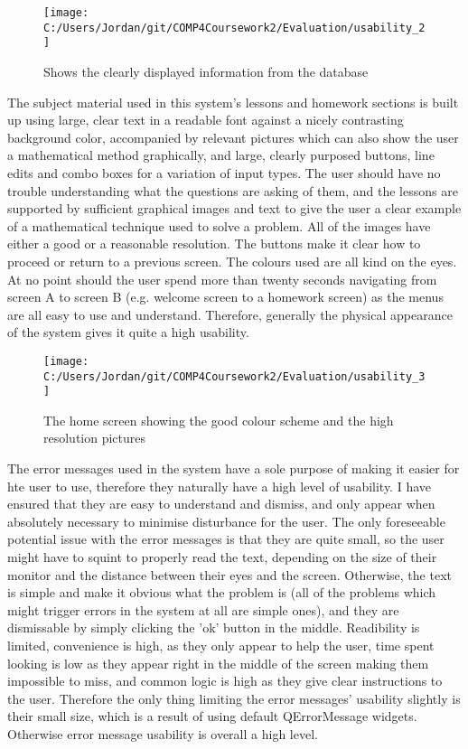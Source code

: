 \begin{figure}[H]
	\texttt{[image: C:/Users/Jordan/git/COMP4Coursework2/Evaluation/usability\_2]}
	\caption{Shows the clearly displayed information from the database}
\end{figure}

The subject material used in this system's lessons and homework sections is built up using large, clear text in a readable font against a nicely contrasting background color, accompanied by relevant pictures which can also show the user a mathematical method graphically, and large, clearly purposed buttons, line edits and combo boxes for a variation of input types. The user should have no trouble understanding what the questions are asking of them, and the lessons are supported by sufficient graphical images and text to give the user a clear example of a mathematical technique used to solve a problem. All of the images have either a good or a reasonable resolution. The buttons make it clear how to proceed or return to a previous screen. The colours used are all kind on the eyes. At no point should the user spend more than twenty seconds navigating from screen A to screen B (e.g. welcome screen to a homework screen) as the menus are all easy to use and understand. Therefore, generally the physical appearance of the system gives it quite a high usability.

\begin{figure}[H]
	\texttt{[image: C:/Users/Jordan/git/COMP4Coursework2/Evaluation/usability\_3]}
	\caption{The home screen showing the good colour scheme and the high resolution pictures}
\end{figure}

The error messages used in the system have a sole purpose of making it easier for hte user to use, therefore they naturally have a high level of usability. I have ensured that they are easy to understand and dismiss, and only appear when absolutely necessary to minimise disturbance for the user. The only foreseeable potential issue with the error messages is that they are quite small, so the user might have to squint to properly read the text, depending on the size of their monitor and the distance between their eyes and the screen. Otherwise, the text is simple and make it obvious what the problem is (all of the problems which might trigger errors in the system at all are simple ones), and they are dismissable by simply clicking the 'ok' button in the middle. Readibility is limited, convenience is high, as they only appear to help the user, time spent looking is low as they appear right in the middle of the screen making them impossible to miss, and common logic is high as they give clear instructions to the user. Therefore the only thing limiting the error messages' usability slightly is their small size, which is a result of using default QErrorMessage widgets. Otherwise error message usability is overall a high level.

